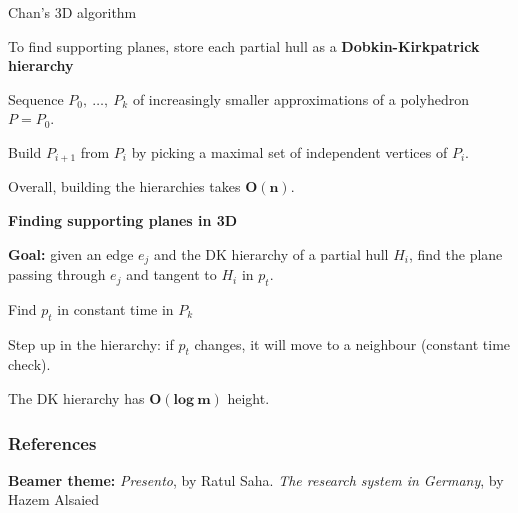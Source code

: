\documentclass[14pt, handout]{beamer}
\begin{document}
\begin{frame}{Chan's 3D algorithm}
	\begin{center}
		\begin{fullpageitemize}
			\vspace{-4mm}
			\item<1->[\rtarrow] To find supporting planes, store each partial hull as a \textbf{Dobkin-Kirkpatrick hierarchy}
			\fontsize{12}{14}\notosansfont
			\begin{sublist}
				\item<2-> Sequence $P_0,\ \ldots,\ P_k$ of increasingly smaller approximations of a polyhedron $P = P_0$.
				\item<3-> Build $P_{i+1}$ from $P_i$ by picking a \textcolor{colorblue}{maximal set of independent vertices} of $P_i$. 
				\item<4-> Overall, building the hierarchies takes \textcolor{colorgreen}{$\bm{O(n)}$}.
			\end{sublist}
			
			\vspace{4mm}
			\item<5->[\rtarrow] \textbf{Finding supporting planes in 3D}	
			\fontsize{12}{14}\notosansfont
			\begin{sublist}
				\item<6-> \textbf{Goal:} given an edge $e_j$ and the DK hierarchy of a partial hull $H_i$, find the \textcolor{colorblue}{plane} passing through $e_j$ and \textcolor{colorblue}{tangent} to $H_i$ in $p_t$.
				\item<7-> Find $p_t$ in constant time in $P_k$
				\item<8-> Step up in the hierarchy: if $p_t$ changes, it will move to a \textcolor{colorblue}{neighbour} (constant time check).
				\item<9-> The DK hierarchy has \textcolor{colorgreen}{$\bm{O(log\ m)}$} height.
			\end{sublist}
		\end{fullpageitemize}
	\end{center}
\end{frame}



\begin{frame}[allowframebreaks]
	\frametitle{References}
	\nocite{*}
	\scriptsize{}	
	\begin{baseitemize}
		\item \textbf{Beamer theme:} \textit{Presento}, by 
		Ratul Saha. \textit{The research system in Germany}, by Hazem Alsaied
	\end{baseitemize}
\end{frame}
\end{document}
